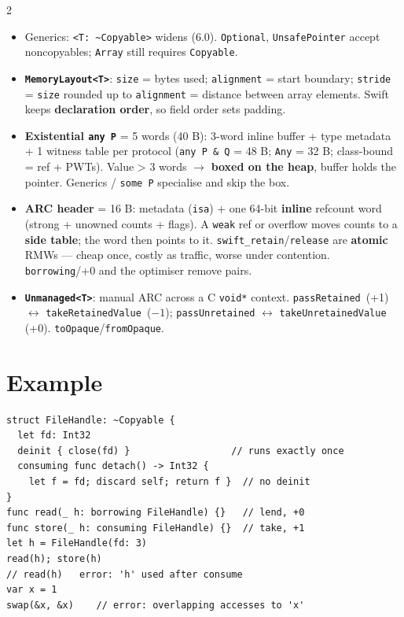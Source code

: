 \documentclass[8pt]{extarticle}
\begin{document}
\begin{multicols}{2}
\begin{itemize}
  \item Generics: \texttt{<T: \textasciitilde Copyable>} widens (6.0).
        \texttt{Optional}, \texttt{UnsafePointer} accept noncopyables;
        \texttt{Array} still requires \texttt{Copyable}.
  \item \textbf{\texttt{MemoryLayout<T>}}: \texttt{size} = bytes used;
        \texttt{alignment} = start boundary; \texttt{stride} = \texttt{size}
        rounded up to \texttt{alignment} = distance between array elements.
        Swift keeps \textbf{declaration order}, so field order sets padding.
  \item \textbf{Existential \texttt{any P}} = 5 words (40 B): 3-word inline
        buffer + type metadata + 1 witness table per protocol
        (\texttt{any P \& Q} = 48 B; \texttt{Any} = 32 B; class-bound = ref +
        PWTs). Value > 3 words $\to$ \textbf{boxed on the heap}, buffer holds the
        pointer. Generics / \texttt{some P} specialise and skip the box.
  \item \textbf{ARC header} = 16 B: metadata (\texttt{isa}) + one 64-bit
        \textbf{inline} refcount word (strong + unowned counts + flags). A
        \texttt{weak} ref or overflow moves counts to a \textbf{side table};
        the word then points to it. \texttt{swift\_retain}/\texttt{release}
        are \textbf{atomic} RMWs — cheap once, costly as traffic, worse under
        contention. \texttt{borrowing}/+0 and the optimiser remove pairs.
  \item \textbf{\texttt{Unmanaged<T>}}: manual ARC across a C \texttt{void*}
        context. \texttt{passRetained}~(+1) $\leftrightarrow$
        \texttt{takeRetainedValue}~($-1$); \texttt{passUnretained} $\leftrightarrow$
        \texttt{takeUnretainedValue} (+0). \texttt{toOpaque}/\texttt{fromOpaque}.
\end{itemize}

\section{Example}
\begin{lstlisting}[language=SwiftSheet]
struct FileHandle: ~Copyable {
  let fd: Int32
  deinit { close(fd) }                  // runs exactly once
  consuming func detach() -> Int32 {
    let f = fd; discard self; return f }  // no deinit
}
func read(_ h: borrowing FileHandle) {}   // lend, +0
func store(_ h: consuming FileHandle) {}  // take, +1
let h = FileHandle(fd: 3)
read(h); store(h)
// read(h)   error: 'h' used after consume
var x = 1
swap(&x, &x)    // error: overlapping accesses to 'x'
\end{lstlisting}


\end{multicols}
\end{document}
